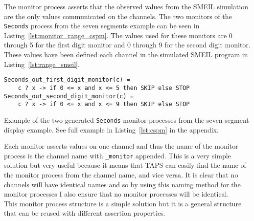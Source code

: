 The monitor process asserts that the observed values from the SMEIL simulation are the only values communicated on the channels. The two monitors of the \texttt{Seconds} process from the seven segments example can be seen in Listing~\ref{lst:monitor_range_cspm}. The values used for these monitors are 0 through 5 for the first digit monitor and 0 through 9 for the second digit monitor. These values have been defined each channel in the simulated SMEIL program in Listing~\ref{lst:range_smeil}.
\begin{listing}
\begin{verbatim}
Seconds_out_first_digit_monitor(c) =
    c ? x -> if 0 <= x and x <= 5 then SKIP else STOP
Seconds_out_second_digit_monitor(c) =
    c ? x -> if 0 <= x and x <= 9 then SKIP else STOP
\end{verbatim}
\caption{Example of the two generated \texttt{Seconds} monitor processes from the seven segment display example. See full example in Listing~\ref{lst:cspm} in the appendix.}
\label{lst:monitor_range_cspm}
\end{listing}
Each monitor asserts values on one channel and thus the name of the monitor process is the channel name with \texttt{\_monitor} appended. This is a very simple solution but very useful because it means that TAPS can easily find the name of the monitor process from the channel name, and vice versa. It is clear that no \cspm{} channels will have identical names and so by using this naming method for the monitor processes I also ensure that no monitor processes will be identical.\\

This monitor process structure is a simple solution but it is a general structure that can be reused with different assertion properties.
